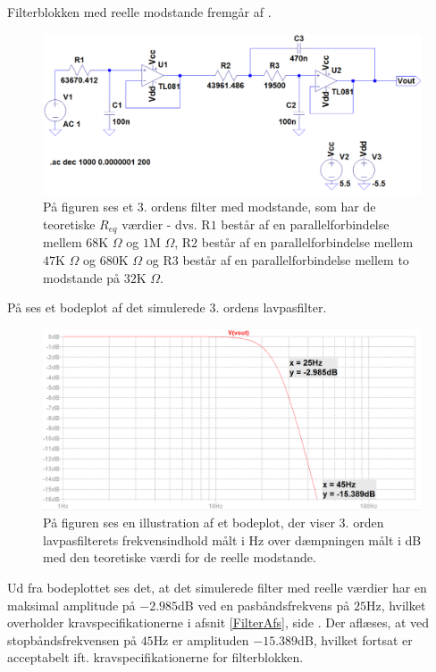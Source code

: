 \noindent Filterblokken med reelle modstande fremgår af .
\begin{figure}[H]
	\centering
	\includegraphics[scale=0.4]{figures/cProblemloesning/Sim_reel_modstande.PNG}
	\caption{På figuren ses et 3. ordens filter med modstande, som har de teoretiske $R_{eq}$ værdier - dvs. R$1$ består af en parallelforbindelse mellem $68$K $\Omega$ og $1$M $\Omega$, R$2$ består af en parallelforbindelse mellem $47$K $\Omega$ og $680$K $\Omega$ og R$3$ består af en parallelforbindelse mellem to modstande på $32$K $\Omega$.}
	\label{fig:Sim_reel_modstande}
\end{figure}
\noindent På  ses et bodeplot af det simulerede $3$. ordens lavpasfilter.
\begin{figure}[H]
	\centering
	\includegraphics[scale=0.35]{figures/cProblemloesning/Sim_reel_graf.PNG}
	\caption{På figuren ses en illustration af et bodeplot, der viser 3. orden lavpasfilterets frekvensindhold målt i Hz over dæmpningen målt i dB med den teoretiske værdi for de reelle modstande.}
	\label{fig:Sim_reel_graf}
\end{figure}

\noindent Ud fra bodeplottet ses det, at det simulerede filter med reelle værdier har en maksimal amplitude på $-2.985$dB ved en pasbåndsfrekvens på $25$Hz, hvilket overholder kravspecifikationerne i afsnit \ref{FilterAfs}, side \pageref{FilterAfs}. Der aflæses, at ved stopbåndsfrekvensen på $45$Hz er amplituden $-15.389$dB, hvilket fortsat er acceptabelt ift. kravspecifikationerne for filterblokken. 


